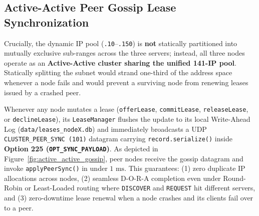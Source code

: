 \documentclass[11pt,a4paper]{article}
\begin{document}
\subsection{Active-Active Peer Gossip Lease Synchronization}
Crucially, the dynamic IP pool (\texttt{.10}--\texttt{.150}) is \textbf{not} statically partitioned into mutually exclusive sub-ranges across the three servers; instead, all three nodes operate as an \textbf{Active-Active cluster sharing the unified 141-IP pool}. Statically splitting the subnet would strand one-third of the address space whenever a node fails and would prevent a surviving node from renewing leases issued by a crashed peer.

Whenever any node mutates a lease (\texttt{offerLease}, \texttt{commitLease}, \texttt{releaseLease}, or \texttt{declineLease}), its \texttt{LeaseManager} flushes the update to its local Write-Ahead Log (\texttt{data/leases\_nodeX.db}) and immediately broadcasts a UDP \texttt{CLUSTER\_PEER\_SYNC (101)} datagram carrying \texttt{record.serialize()} inside \textbf{Option 225 (\texttt{OPT\_SYNC\_PAYLOAD})}. As depicted in Figure~\ref{fig:active_active_gossip}, peer nodes receive the gossip datagram and invoke \texttt{applyPeerSync()} in under $1\text{ ms}$. This guarantees: (1) zero duplicate IP allocations across nodes, (2) seamless D-O-R-A completion even under Round-Robin or Least-Loaded routing where \texttt{DISCOVER} and \texttt{REQUEST} hit different servers, and (3) zero-downtime lease renewal when a node crashes and its clients fail over to a peer.
\end{document}
